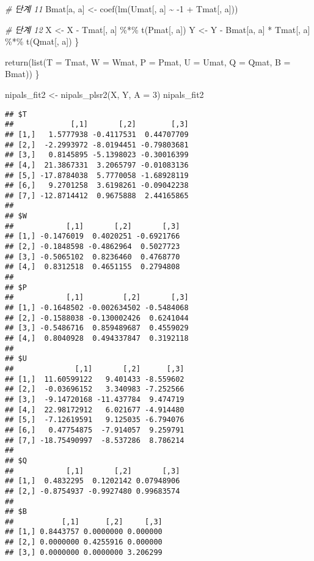 \documentclass[
]{book}
\newenvironment{Shaded}{\begin{snugshade}}{\end{snugshade}}
\newcommand{\AttributeTok}[1]{\textcolor[rgb]{0.77,0.63,0.00}{#1}}
\newcommand{\CommentTok}[1]{\textcolor[rgb]{0.56,0.35,0.01}{\textit{#1}}}
\newcommand{\DecValTok}[1]{\textcolor[rgb]{0.00,0.00,0.81}{#1}}
\newcommand{\FunctionTok}[1]{\textcolor[rgb]{0.00,0.00,0.00}{#1}}
\newcommand{\NormalTok}[1]{#1}
\newcommand{\OtherTok}[1]{\textcolor[rgb]{0.56,0.35,0.01}{#1}}
\newcommand{\SpecialCharTok}[1]{\textcolor[rgb]{0.00,0.00,0.00}{#1}}
\begin{document}
\begin{Shaded}
\begin{Highlighting}[]
    \CommentTok{\# 단계 11}
\NormalTok{    Bmat[a, a] }\OtherTok{\textless{}{-}} \FunctionTok{coef}\NormalTok{(}\FunctionTok{lm}\NormalTok{(Umat[, a] }\SpecialCharTok{\textasciitilde{}} \SpecialCharTok{{-}}\DecValTok{1} \SpecialCharTok{+}\NormalTok{ Tmat[, a]))}

    \CommentTok{\# 단계 12}
\NormalTok{    X }\OtherTok{\textless{}{-}}\NormalTok{ X }\SpecialCharTok{{-}}\NormalTok{ Tmat[, a] }\SpecialCharTok{\%*\%} \FunctionTok{t}\NormalTok{(Pmat[, a])}
\NormalTok{    Y }\OtherTok{\textless{}{-}}\NormalTok{ Y }\SpecialCharTok{{-}}\NormalTok{ Bmat[a, a] }\SpecialCharTok{*}\NormalTok{ Tmat[, a] }\SpecialCharTok{\%*\%} \FunctionTok{t}\NormalTok{(Qmat[, a])}
\NormalTok{  \}}
  
  \FunctionTok{return}\NormalTok{(}\FunctionTok{list}\NormalTok{(}\AttributeTok{T =}\NormalTok{ Tmat, }\AttributeTok{W =}\NormalTok{ Wmat, }\AttributeTok{P =}\NormalTok{ Pmat, }
              \AttributeTok{U =}\NormalTok{ Umat, }\AttributeTok{Q =}\NormalTok{ Qmat, }\AttributeTok{B =}\NormalTok{ Bmat))}
\NormalTok{\}}

\NormalTok{nipals\_fit2 }\OtherTok{\textless{}{-}} \FunctionTok{nipals\_plsr2}\NormalTok{(X, Y, }\AttributeTok{A =} \DecValTok{3}\NormalTok{)}
\NormalTok{nipals\_fit2}
\end{Highlighting}
\end{Shaded}

\begin{verbatim}
## $T
##             [,1]       [,2]        [,3]
## [1,]   1.5777938 -0.4117531  0.44707709
## [2,]  -2.2993972 -8.0194451 -0.79803681
## [3,]   0.8145895 -5.1398023 -0.30016399
## [4,]  21.3867331  3.2065797 -0.01083136
## [5,] -17.8784038  5.7770058 -1.68928119
## [6,]   9.2701258  3.6198261 -0.09042238
## [7,] -12.8714412  0.9675888  2.44165865
## 
## $W
##            [,1]       [,2]       [,3]
## [1,] -0.1476019  0.4020251 -0.6921766
## [2,] -0.1848598 -0.4862964  0.5027723
## [3,] -0.5065102  0.8236460  0.4768770
## [4,]  0.8312518  0.4651155  0.2794808
## 
## $P
##            [,1]         [,2]       [,3]
## [1,] -0.1648502 -0.002634502 -0.5484068
## [2,] -0.1588038 -0.130002426  0.6241044
## [3,] -0.5486716  0.859489687  0.4559029
## [4,]  0.8040928  0.494337847  0.3192118
## 
## $U
##              [,1]       [,2]      [,3]
## [1,]  11.60599122   9.401433 -8.559602
## [2,]  -0.03696152   3.340983 -7.252566
## [3,]  -9.14720168 -11.437784  9.474719
## [4,]  22.98172912   6.021677 -4.914480
## [5,]  -7.12619591   9.125035 -6.794076
## [6,]   0.47754875  -7.914057  9.259791
## [7,] -18.75490997  -8.537286  8.786214
## 
## $Q
##            [,1]       [,2]       [,3]
## [1,]  0.4832295  0.1202142 0.07948906
## [2,] -0.8754937 -0.9927480 0.99683574
## 
## $B
##           [,1]      [,2]     [,3]
## [1,] 0.8443757 0.0000000 0.000000
## [2,] 0.0000000 0.4255916 0.000000
## [3,] 0.0000000 0.0000000 3.206299
\end{verbatim}
\end{document}
